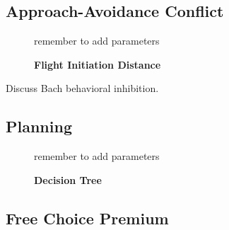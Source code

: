 \documentclass[11pt]{article} %
\begin{document}
\subsection{Approach-Avoidance Conflict}

\begin{figure}
  \centerline{%
  }
  \caption{\textbf{Flight Initiation Distance}}
  \par remember to add parameters
\end{figure}

Discuss Bach behavioral inhibition.

\subsection{Planning}

\begin{figure}
  \centerline{%
  }
  \caption{\textbf{Decision Tree}}
  \par remember to add parameters
\end{figure}

\subsection{Free Choice Premium}
\end{document}
